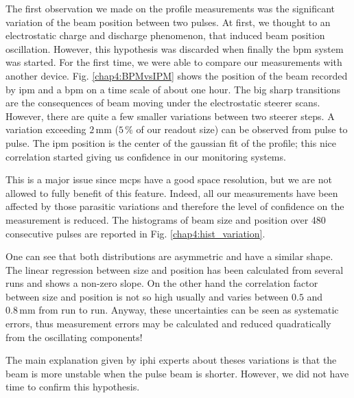 \begin{refsection}
  The first observation we made on the profile measurements was the significant variation of the beam position between two pulses. At first, we thought to an electrostatic charge and discharge phenomenon, that induced beam position oscillation. However, this hypothesis was discarded when finally the \acrshort{bpm} system was started. For the first time, we were able to compare our measurements with another device. Fig. \ref{chap4:BPMvsIPM} shows the position of the beam recorded by \acrshort{ipm} and a \acrshort{bpm} on a time scale of about one hour. The big sharp transitions are the consequences of beam moving under the electrostatic steerer scans. However, there are quite a few smaller variations between two steerer steps. A variation exceeding $2\,\mathrm{mm}$ ($5\,\mathrm{\%}$ of our readout size) can be observed from pulse to pulse. The \acrshort{ipm} position is the center of the gaussian fit of the profile; this nice correlation started giving us confidence in our monitoring systems.

  

  This is a major issue since \acrshort{mcp}s have a good space resolution, but we are not allowed to fully benefit of this feature. Indeed, all our measurements have been affected by those parasitic variations and therefore the level of confidence on the measurement is reduced. The histograms of beam size and position over 480 consecutive pulses are reported in Fig. \ref{chap4:hist_variation}.
  

  One can see that both distributions are asymmetric and have a similar shape. The linear regression between size and position has been calculated from several runs and shows a non-zero slope. On the other hand the correlation factor between size and position is not so high usually and varies between $0.5$ and $0.8\,\mathrm{mm}$ from run to run.
  Anyway, these uncertainties can be seen as systematic errors, thus measurement errors may be calculated and reduced quadratically from the oscillating components!

  The main explanation given by \acrshort{iphi} experts about theses variations is that the beam is more unstable when the pulse beam is shorter. However, we did not have time to confirm this hypothesis.


\end{refsection}
